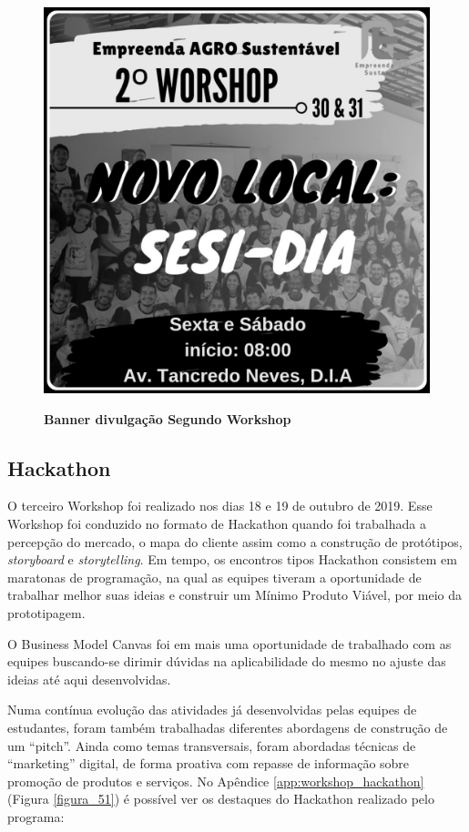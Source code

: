 \begin{figure}[H]
\centering
\caption{\textbf{Banner divulgação Segundo Workshop}}
\includegraphics[scale=0.23]{Imagens/2_workshop.jpg}
\label{fig:ods}
\end{figure}

\subsection{Hackathon}

O terceiro Workshop foi realizado nos dias 18 e 19 de outubro de 2019. Esse Workshop foi conduzido no formato de Hackathon quando foi trabalhada a percepção do mercado, o mapa do cliente assim como a construção de protótipos, \textit{storyboard} e \textit{storytelling}. Em tempo, os encontros tipos Hackathon consistem em maratonas de programação, na qual as equipes tiveram a oportunidade de trabalhar melhor suas ideias e construir um Mínimo Produto Viável, por meio da prototipagem.

O Business Model Canvas foi em mais uma oportunidade de trabalhado com as equipes buscando-se dirimir dúvidas na aplicabilidade do mesmo no ajuste das ideias até aqui desenvolvidas.

Numa contínua evolução das atividades já desenvolvidas pelas equipes de estudantes, foram também trabalhadas diferentes abordagens de construção de um “pitch”. Ainda como temas transversais, foram abordadas técnicas de “marketing” digital, de forma proativa com repasse de informação sobre promoção de produtos e serviços. No Apêndice \ref{app:workshop_hackathon} (Figura \ref{figura_51}) é possível ver os destaques do Hackathon realizado pelo programa:

